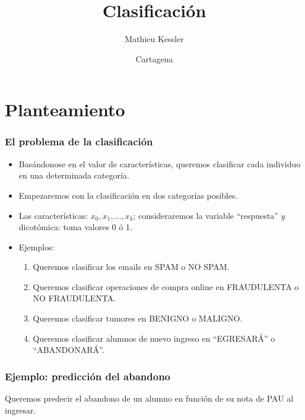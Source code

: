 \documentclass{beamer}
\title{Clasificación }
\author[Kessler]{Mathieu Kessler}
\institute[UPCT]{
  Departamento de Matemática Aplicada y Estadística\\
  Universidad Politécnica de Cartagena}
\date[Cartagena]{Cartagena}
\begin{document}
\begin{frame}
  \titlepage
\end{frame}
   \section{Planteamiento}
 \begin{frame}\frametitle{El problema de la clasificación}
      \begin{itemize}
     \item<+-> Basándonose en el valor de características, queremos clasificar cada individuo en una determinada categoría.
     \item<+-> Empezaremos con la clasificación en dos categorías posibles.
     \item<+-> Las características: $x_0,x_1,\ldots,x_k$; consideraremos la variable ``respuesta'' $y$ dicotómica: toma valores 0 ó 1.
     \item<+-> Ejemplos: 
       \begin{enumerate}
       \item<+-> Queremos clasificar los emails en SPAM o NO SPAM.
       \item<+-> Queremos clasificar operaciones de compra online en FRAUDULENTA o NO FRAUDULENTA.
       \item<+-> Queremos clasificar tumores en BENIGNO o MALIGNO.
       \item<+-> Queremos clasificar alumnos de nuevo ingreso en ``EGRESARÁ'' o ``ABANDONARÁ''.
       \end{enumerate}
     \end{itemize}
 \end{frame}
 \begin{frame}\frametitle{Ejemplo: predicción del abandono}
   \begin{overlayarea}{\textwidth}{8cm} 
   Queremos predecir el abandono de un alumno en función de su nota de PAU al ingresar.%
   \end{overlayarea}
   
 \end{frame}
\end{document}
